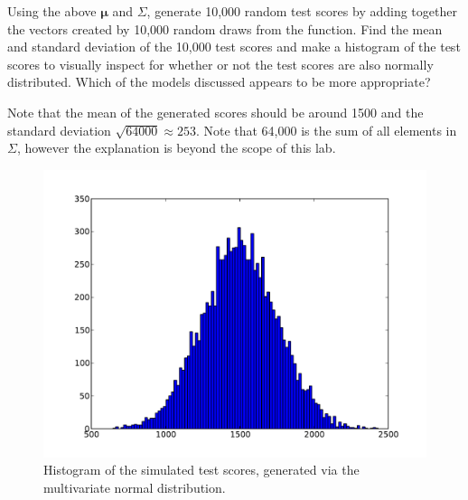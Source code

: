 \begin{problem}
Using the above $\mathbf{\mu}$ and $\Sigma$, generate 10,000 random test scores by adding together the vectors created by 10,000 random draws from the 
 function. 
Find the mean and standard deviation of the 10,000 test scores and make a histogram of the test scores to visually 
inspect for whether or not the test scores are also normally distributed. 
Which of the models discussed appears to be more appropriate?
\end{problem}

Note that the mean of the generated scores should be around 1500 and the standard deviation $\sqrt{64000} \approx 253$. 
Note that 64,000 is the sum of all elements in $\Sigma$, however the explanation is beyond the scope of this lab. 
\begin{figure}[h]
\includegraphics[width=\textwidth]{scorehist-mvn.pdf}
\caption{Histogram of the simulated test scores, generated via the multivariate normal distribution.}
\end{figure}



